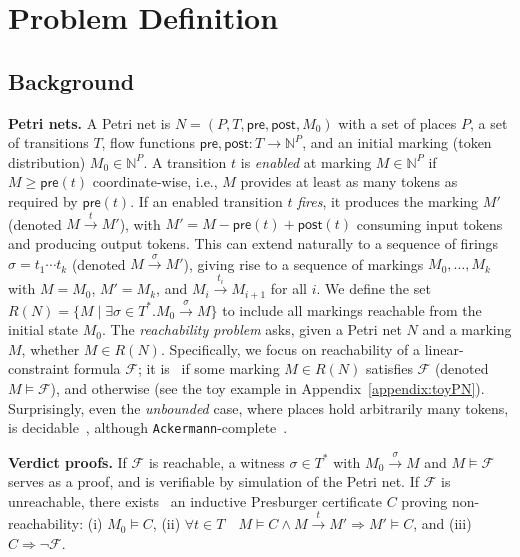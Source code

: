 \vspace{-3.0pt}
\section{Problem Definition}
\label{sec:problem-definition}


\subsection{Background}
\label{subsec:background}

\textbf{Petri nets.} 
A Petri net is $N=(P,T,\mathsf{pre},\mathsf{post},M_0)$ with a set of places $P$, a set of transitions $T$, flow functions $\mathsf{pre},\mathsf{post}:T\to\mathbb N^P$, and an initial marking (token distribution) $M_0\in\mathbb N^P$.  
A transition $t$ is \textit{enabled} at marking $M \in \mathbb N^P$ if $M\ge \mathsf{pre}(t)$ coordinate-wise, i.e., $M$ provides at least as many tokens as required by $\mathsf{pre}(t)$.
%
If an enabled transition \(t\) \textit{fires}, it produces the marking $M'$ (denoted $M\xrightarrow{t}M'$), with $M'= M - \mathsf{pre}(t) + \mathsf{post}(t)$ consuming input tokens and producing output tokens.
%
This can extend naturally to a sequence of firings $\sigma = t_1\cdots t_k$ (denoted $M \xrightarrow{\sigma} M'$), giving rise to a sequence of markings $M_0,\ldots,M_k$ with $M=M_0$, $M'=M_k$, and $M_i \xrightarrow{t_{i}} M_{i+1}$ for all $i$. 
% 
We define the set $R(N)=\{M \mid \exists \sigma\in T^*. M_0 \xrightarrow{\sigma} M\}$ to include all markings reachable from the initial state $M_0$.
% 
The \textit{reachability problem} asks, given a Petri net $N$ and a marking $M$, whether $M\in R(N)$. 
%
Specifically, we focus on reachability of a linear-constraint formula $\mathcal {F}$; it is \sat\ if some marking $M\in R(N)$ satisfies $\mathcal {F}$ (denoted $M \models \mathcal {F}$), and otherwise \unsat{} (see the toy example in 	Appendix~\ref{appendix:toyPN}).
%
Surprisingly, even the \textit{unbounded} case, where places hold arbitrarily many tokens, is decidable~\cite{Ma81,Ko82,La92}, although \texttt{Ackermann}-complete~\cite{CzWo22,Le22}.   



\medskip
\noindent
\textbf{Verdict proofs.} 
If $\mathcal {F}$ is reachable, a witness $\sigma\in T^*$ with $M_0\xrightarrow{\sigma}M$ and $M\models \mathcal {F}$ serves as a proof, and is verifiable by simulation of the Petri net.  
If $\mathcal {F}$ is unreachable, there exists~\cite{Le09} an inductive Presburger certificate $C$ proving non-reachability: 
(i) $M_0\models C$, (ii) $\forall t\in T \quad M\models C \wedge M\xrightarrow{t}M'\Rightarrow M'\models C$, and (iii) $C\Rightarrow \neg \mathcal {F}$.

